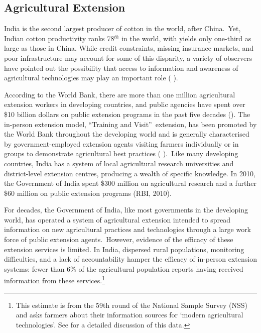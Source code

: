 \documentclass[12pt]{article}
\begin{document}
\subsection{\protect\normalsize Agricultural Extension}

{\normalsize India is the second largest producer of cotton in the world,
after China.\ Yet, Indian cotton productivity ranks 78$^{th}$ in the world,
with yields only one-third as large as those in China. While credit
constraints, missing insurance markets, and poor infrastructure may account
for some of this disparity, a variety of observers have pointed out the
possibility that access to information and awareness of agricultural technologies may play an important role (%
\citealp{Jack_2011}).}

{\normalsize According to the World Bank, there are more than one million
agricultural extension workers in developing countries, and public agencies
have spent over \$10 billion dollars on public extension programs in the
past five decades (\citealp{Feder_2005}). The in-person extension model,
\textquotedblleft Training and Visit\textquotedblright\ extension, has been
promoted by the World Bank throughout the developing world and is generally
characterised by government-employed extension agents visiting farmers
individually or in groups to demonstrate agricultural best practices (%
\citealp{Anderson_2007}).\ Like many developing countries, India has a
system of local agricultural research universities and district-level
extension centres, producing a wealth of specific knowledge. In 2010, the
Government of India spent \$300 million on agricultural research and a
further \$60 million on public extension programs (RBI, 2010).}

{\normalsize For decades, the Government of India, like most governments in
the developing world, has operated a system of agricultural extension
intended to spread information on new agricultural practices and
technologies through a large work force of public extension agents.\
However, evidence of the efficacy of these extension services is limited. In
India, dispersed rural populations, monitoring difficulties, and a lack of
accountability hamper the efficacy of in-person extension systems: fewer
than 6\% of the agricultural population reports having received information
from these services.\footnote{%
This estimate is from the 59th round of the National Sample Survey (NSS) and
asks farmers about their information sources for `modern agricultural
technologies'. See \citealp{GBA_2010} for a detailed discussion of this data.%
} }
\end{document}

